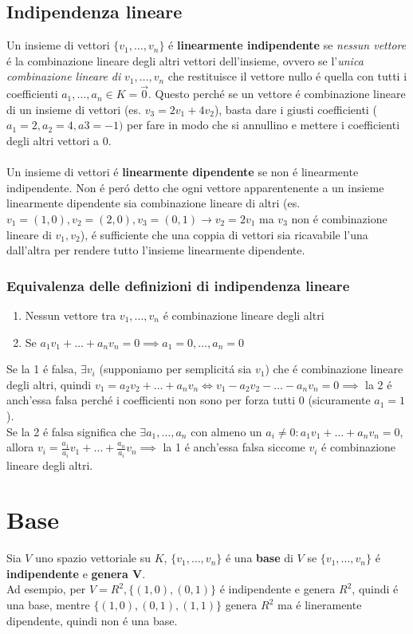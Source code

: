 \documentclass{article}
\begin{document}
\subsection{Indipendenza lineare}
Un insieme di vettori $\{v_1, \dots, v_n\}$ é \textbf{linearmente indipendente} se \textit{nessun vettore} é la combinazione lineare degli altri vettori dell'insieme, ovvero se l'\textit{unica combinazione lineare di} $v_1, \dots, v_n$ che restituisce il vettore nullo é quella con tutti i coefficienti $a_1, \dots, a_n \in K = \vec{0}$. Questo perché se un vettore é combinazione lineare di un insieme di vettori (es. $v_3 = 2v_1 + 4v_2$), basta dare i giusti coefficienti ($a_1=2, a_2=4, a3=-1)$ per fare in modo che si annullino e mettere i coefficienti degli altri vettori a 0.\\\\
Un insieme di vettori é \textbf{linearmente dipendente} se non é linearmente indipendente. Non é peró detto che ogni vettore apparentenente a un insieme linearmente dipendente sia combinazione lineare di altri (es. $v_1 = (1,0), v_2 = (2,0), v_3 = (0,1) \rightarrow v_2=2v_1$ ma $v_3$ non é combinazione lineare di $v_1, v_2$), é sufficiente che una coppia di vettori sia ricavabile l'una dall'altra per rendere tutto l'insieme linearmente dipendente.

\subsubsection{Equivalenza delle definizioni di indipendenza lineare}
\begin{enumerate}
	\item Nessun vettore tra $v_1, \dots, v_n$ é combinazione lineare degli altri
	\item Se $a_1v_1 + \dots + a_nv_n = 0 \implies a_1=0, \dots,a_n=0$
\end{enumerate}
Se la 1 é falsa, $\exists v_i$ (supponiamo per semplicitá sia $v_1$) che é combinazione lineare degli altri, quindi $v_1 = a_2v_2 + \dots + a_nv_n \iff v_1 - a_2v_2 - \dots - a_nv_n = 0 \implies$ la 2 é anch'essa falsa perché i coefficienti non sono per forza tutti 0 (sicuramente $a_1=1$).\\
Se la 2 é falsa significa che $\exists a_1, \dots, a_n$ con almeno un $a_i \ne 0 : a_1v_1 + \dots + a_nv_n = 0$, allora $\displaystyle v_i = \frac{a_1}{a_i}v_1 + \dots + \frac{a_n}{a_i}v_n \implies$ la 1 é anch'essa falsa siccome $v_i$ é combinazione lineare degli altri.

\section{Base}
Sia $V$ uno spazio vettoriale su $K$, $\{v_1, \dots, v_n\}$ é una \textbf{base} di $V$ se $\{v_1, \dots, v_n\}$ é \textbf{indipendente} e \textbf{genera V}.\\
Ad esempio, per $V=R^2, \{(1,0),(0,1)\}$ é indipendente e genera $R^2$, quindi é una base, mentre $\{(1,0), (0,1), (1,1)\}$ genera $R^2$ ma é lineramente dipendente, quindi non é una base.
\end{document}
